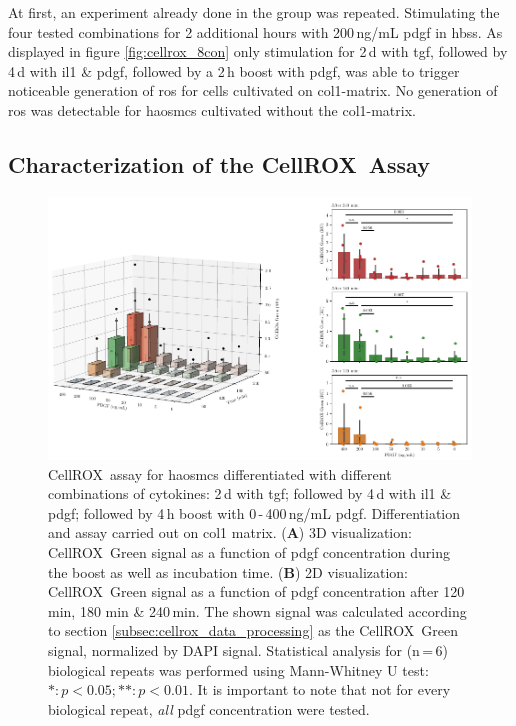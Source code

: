     At first, an experiment already done in the group was repeated. Stimulating the four tested combinations for 2 additional hours with 200\,ng/mL \ac{pdgf} in \ac{hbss}. As displayed in figure \ref{fig:cellrox_8con} only stimulation for 2\,d with \ac{tgf}, followed by 4\,d with \ac{il1} \& \ac{pdgf}, followed by a 2\,h boost with \ac{pdgf}, was able to trigger noticeable generation of \ac{ros} for cells cultivated on \ac{col1}-matrix. No generation of \ac{ros} was detectable for \acp{haosmc} cultivated without the \ac{col1}-matrix.

    \subsection{Characterization of the CellROX\texttrademark~Assay}
    \begin{figure}[h!]
    \capstart
        \centering
    	\includegraphics{Abbildung/CellROX_titration_no_norm.pdf}

    	\begin{minipage}{\captionwidth}
    		\caption[cellROX_titration]{ \newline
            CellROX\texttrademark~assay for \acp{haosmc} differentiated with different combinations of cytokines: 2\,d with \ac{tgf}; followed by 4\,d with \ac{il1} \& \ac{pdgf}; followed by 4\,h boost with 0\,-\,400\,ng/mL \ac{pdgf}. Differentiation and assay carried out on \ac{col1} matrix.
            (\textbf{A}) 3D visualization: CellROX\texttrademark~Green signal as a function of \ac{pdgf} concentration during the boost as well as incubation time.
            (\textbf{B}) 2D visualization: CellROX\texttrademark~Green signal as a function of \ac{pdgf} concentration after 120 min, 180 min \& 240\,min.
            The shown signal was calculated according to section \ref{subsec:cellrox_data_processing} as the CellROX\texttrademark~Green signal, normalized by DAPI signal. Statistical analysis for (n\,=\,6) biological repeats was performed using Mann-Whitney U test: $*: p < 0.05; **: p < 0.01$. It is important to note that not for every biological repeat, \textit{all} \ac{pdgf} concentration were tested. }
    		\label{fig:cellROX_titration}
    	\end{minipage}
    \end{figure}

